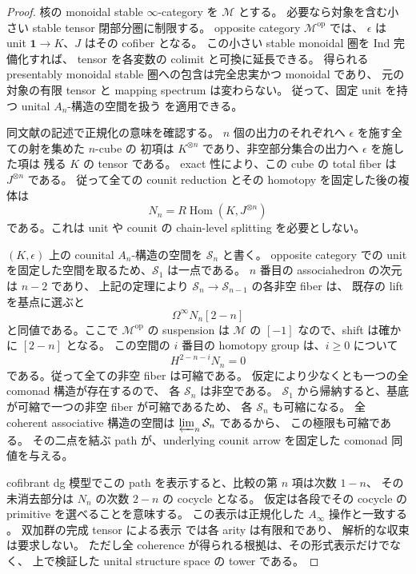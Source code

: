 \begin{proof}
核の monoidal stable $\infty$-category を $\mathscr M$ とする。
必要なら対象を含む小さい stable tensor 閉部分圏に制限する。
opposite category $\mathscr M^{\mathrm{op}}$ では、
$\epsilon$ は unit $\mathbf1\to K$、$J$ はその cofiber となる。
この小さい stable monoidal 圏を Ind 完備化すれば、
tensor を各変数の colimit と可換に延長できる。
得られる presentably monoidal stable 圏への包含は完全忠実かつ monoidal であり、
元の対象の有限 tensor と mapping spectrum は変わらない。
従って、固定 unit を持つ unital $A_n$-構造の空間を扱う
\cite[Theorem~3.3 and Lemma~3.11]{CMOWillumsgaardAssociativity}を適用できる。

同文献の記述で正規化の意味を確認する。
$n$ 個の出力のそれぞれへ $\epsilon$ を施す全ての射を集めた $n$-cube の
初項は $K^{\otimes n}$ であり、非空部分集合の出力へ $\epsilon$ を施した項は
残る $K$ の tensor である。
exact 性により、この cube の total fiber は $J^{\otimes n}$ である。
従って全ての counit reduction とその homotopy を固定した後の複体は
\begin{equation}
\label{cmo:eq:normalized-comonad-complex}
 N_n=R\operatorname{Hom}(K,J^{\otimes n})
\end{equation}
である。これは unit や counit の chain-level splitting を必要としない。

$(K,\epsilon)$ 上の counital $A_n$-構造の空間を $\mathcal S_n$ と書く。
opposite category での unit を固定した空間を取るため、$\mathcal S_1$ は一点である。
$n$ 番目の associahedron の次元は $n-2$ であり、
上記の定理により $\mathcal S_n\to\mathcal S_{n-1}$ の各非空 fiber は、
既存の lift を基点に選ぶと
\begin{equation}
\label{cmo:eq:normalized-comonad-structure-fiber}
 \Omega^\infty N_n[2-n]
\end{equation}
と同値である。ここで $\mathscr M^{\mathrm{op}}$ の suspension は
$\mathscr M$ の $[-1]$ なので、shift は確かに $[2-n]$ となる。
この空間の $i$ 番目の homotopy group は、$i\ge0$ について
\[
 H^{2-n-i}N_n=0
\]
である。従って全ての非空 fiber は可縮である。
仮定により少なくとも一つの全 comonad 構造が存在するので、
各 $\mathcal S_n$ は非空である。
$\mathcal S_1$ から帰納すると、基底が可縮で一つの非空 fiber が可縮であるため、
各 $\mathcal S_n$ も可縮になる。
全 coherent associative 構造の空間は $\varprojlim_n\mathcal S_n$ であるから、
この極限も可縮である。
その二点を結ぶ path が、underlying counit arrow を固定した comonad 同値を与える。

cofibrant dg 模型でこの path を表示すると、比較の第 $n$ 項は次数 $1-n$、
その未消去部分は $N_n$ の次数 $2-n$ の cocycle となる。
仮定は各段でその cocycle の primitive を選べることを意味する。
この表示は正規化した $A_\infty$ 操作と一致する
\cite[Definition~4.1 and Lemma~4.4]{CMOBurkeStrictUnit}。
双加群の完成 tensor による表示
\cite[Sections~2.1 and~2.3]{CMONegronVolkovWitherspoon}では各 arity は有限和であり、
解析的な収束は要求しない。
ただし全 coherence が得られる根拠は、その形式表示だけでなく、
上で検証した unital structure space の tower である。
\end{proof}

